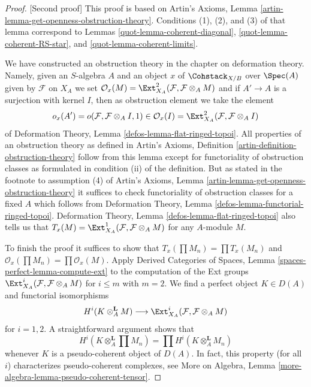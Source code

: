 \begin{proof}
[Second proof]
This proof is based on
Artin's Axioms, Lemma \ref{artin-lemma-get-openness-obstruction-theory}.
Conditions (1), (2), and (3) of that lemma correspond to
Lemmas \ref{quot-lemma-coherent-diagonal},
\ref{quot-lemma-coherent-RS-star}, and
\ref{quot-lemma-coherent-limits}.

\medskip\noindent
We have constructed an obstruction theory in the chapter on
deformation theory. Namely, given an $S$-algebra $A$ and an
object $x$ of $\Cohstack_{X/B}$ over $\Spec(A)$ given
by $\mathcal{F}$ on $X_A$ we set
$\mathcal{O}_x(M) = \Ext^2_{X_A}(\mathcal{F}, \mathcal{F} \otimes_A M)$
and if $A' \to A$ is a surjection with kernel $I$, then as obstruction
element we take the element
$$
o_x(A') = o(\mathcal{F}, \mathcal{F} \otimes_A I, 1) \in
\mathcal{O}_x(I) = \Ext^2_{X_A}(\mathcal{F}, \mathcal{F} \otimes_A I)
$$
of Deformation Theory, Lemma \ref{defos-lemma-flat-ringed-topoi}.
All properties of an obstruction theory as defined in
Artin's Axioms, Definition \ref{artin-definition-obstruction-theory}
follow from this lemma except for functoriality of obstruction classes
as formulated in condition (ii) of the definition. But as stated in
the footnote to assumption (4) of
Artin's Axioms, Lemma \ref{artin-lemma-get-openness-obstruction-theory}
it suffices to check functoriality of obstruction classes
for a fixed $A$ which follows from
Deformation Theory, Lemma \ref{defos-lemma-functorial-ringed-topoi}.
Deformation Theory, Lemma \ref{defos-lemma-flat-ringed-topoi}
also tells us that
$T_x(M) = \Ext^1_{X_A}(\mathcal{F}, \mathcal{F} \otimes_A M)$
for any $A$-module $M$.

\medskip\noindent
To finish the proof it suffices to show that
$T_x(\prod M_n) = \prod T_x(M_n)$ and
$\mathcal{O}_x(\prod M_n) = \prod \mathcal{O}_x(M)$.
Apply Derived Categories of Spaces, Lemma
\ref{spaces-perfect-lemma-compute-ext}
to the computation of the Ext groups
$\Ext^i_{X_A}(\mathcal{F}, \mathcal{F} \otimes_A M)$
for $i \leq m$ with $m = 2$. We find a perfect object $K \in D(A)$
and functorial isomorphisms
$$
H^i(K \otimes_A^\mathbf{L} M)
\longrightarrow
\Ext^i_{X_A}(\mathcal{F}, \mathcal{F} \otimes_A M)
$$
for $i = 1, 2$. A straightforward argument shows that
$$
H^i(K \otimes_A^\mathbf{L} \prod M_n) =
\prod H^i(K \otimes_A^\mathbf{L} M_n)
$$
whenever $K$ is a pseudo-coherent object of $D(A)$.
In fact, this property (for all $i$) characterizes
pseudo-coherent complexes, see
More on Algebra, Lemma \ref{more-algebra-lemma-pseudo-coherent-tensor}.
\end{proof}

